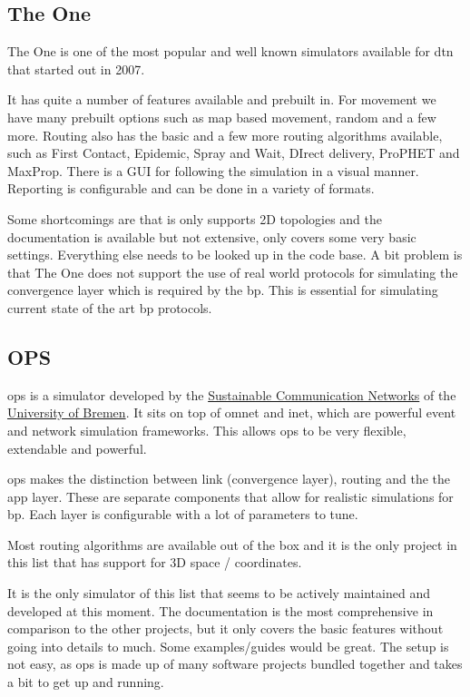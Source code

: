 \documentclass{tudscrartcl}
\newcommand{\dtn}{
  \ac{dtn}
}
\begin{document}
\subsection{The One}

The One is one of the most popular and well known simulators available for \dtn that started out in 2007.

It has quite a number of features available and prebuilt in.
For movement we have many prebuilt options such as map based movement, random and a few more.
Routing also has the basic and a few more routing algorithms available, such as First Contact, Epidemic, Spray and Wait, DIrect delivery, ProPHET and MaxProp.
There is a GUI for following the simulation in a visual manner.
Reporting is configurable and can be done in a variety of formats.

Some shortcomings are that is only supports 2D topologies and the documentation is available but not extensive, only covers some very basic settings. Everything else needs to be looked up in the code base.
A bit problem is that The One does not support the use of real world protocols for simulating the convergence layer which is required by the \ac{bp}. This is essential for simulating current state of the art \ac{bp} protocols.

\subsection{OPS}

\ac{ops} is a simulator developed by the \href{https://www.uni-bremen.de/comnets}{Sustainable Communication Networks} of the \href{https://www.uni-bremen.de/}{University of Bremen}. It sits on top of \ac{omnet} and \ac{inet}, which are powerful event and network simulation frameworks. This allows \ac{ops} to be very flexible, extendable and powerful.

\ac{ops} makes the distinction between link (convergence layer), routing and the the app layer. These are separate components that allow for realistic simulations for \ac{bp}. Each layer is configurable with a lot of parameters to tune.

Most routing algorithms are available out of the box and it is the only project in this list that has support for 3D space / coordinates.

It is the only simulator of this list that seems to be actively maintained and developed at this moment. The documentation is the most comprehensive in comparison to the other projects, but it only covers the basic features without going into details to much. Some examples/guides would be great. The setup is not easy, as \ac{ops} is made up of many software projects bundled together and takes a bit to get up and running.
\end{document}
